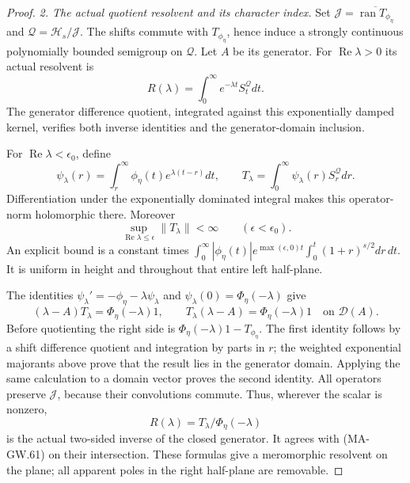 \begin{proof}
\emph{2. The actual quotient resolvent and its character index.}
Set \(\mathcal J=\overline{\operatorname{ran}T_{\phi_\eta}}\)
and \(\mathcal Q=\mathcal H_s/\mathcal J\).
The shifts commute with \(T_{\phi_\eta}\), hence induce a
strongly continuous polynomially bounded semigroup on
\(\mathcal Q\).  Let \(A\) be its generator.
For \(\operatorname{Re}\lambda>0\) its actual resolvent is
\[
 R(\lambda)=\int_0^\infty e^{-\lambda t}S_t^{\mathcal Q}dt.
 \tag{MA-GW.61}
\]
The generator difference quotient, integrated against this
exponentially damped kernel, verifies both inverse identities
and the generator-domain inclusion.

For \(\operatorname{Re}\lambda<\epsilon_0\), define
\[
 \psi_\lambda(r)=\int_r^\infty
                  \phi_\eta(t)e^{\lambda(t-r)}dt,\qquad
 T_\lambda=\int_0^\infty\psi_\lambda(r)S_r^{\mathcal Q}dr.
 \tag{MA-GW.62}
\]
Differentiation under the exponentially dominated integral
makes this operator-norm holomorphic there.  Moreover
\[
 \sup_{\operatorname{Re}\lambda\le\epsilon}\|T_\lambda\|<\infty
                                      \qquad(\epsilon<\epsilon_0).
 \tag{MA-GW.63}
\]
An explicit bound is a constant times
\(\int_0^\infty|\phi_\eta(t)|e^{\max(\epsilon,0)t}
\int_0^t(1+r)^{s/2}dr\,dt\).
It is uniform in height and throughout that entire left
half-plane.

The identities
\(\psi_\lambda'=-\phi_\eta-\lambda\psi_\lambda\) and
\(\psi_\lambda(0)=\Phi_\eta(-\lambda)\) give
\[
 (\lambda-A)T_\lambda=\Phi_\eta(-\lambda)1,\qquad
 T_\lambda(\lambda-A)=\Phi_\eta(-\lambda)1
                                      \quad\text{on }\mathcal D(A).
 \tag{MA-GW.64}
\]
Before quotienting the right side is
\(\Phi_\eta(-\lambda)1-T_{\phi_\eta}\).
The first identity follows by a shift difference quotient
and integration by parts in \(r\); the weighted exponential
majorants above prove that the result lies in the generator
domain.  Applying the same calculation to a domain vector
proves the second identity.  All operators preserve
\(\mathcal J\), because their convolutions commute.
Thus, wherever the scalar is nonzero,
\[
                         R(\lambda)=T_\lambda/\Phi_\eta(-\lambda)
 \tag{MA-GW.65}
\]
is the actual two-sided inverse of the closed generator.
It agrees with (MA-GW.61) on their intersection.
These formulas give a meromorphic resolvent on the plane;
all apparent poles in the right half-plane are removable.


\end{proof}
